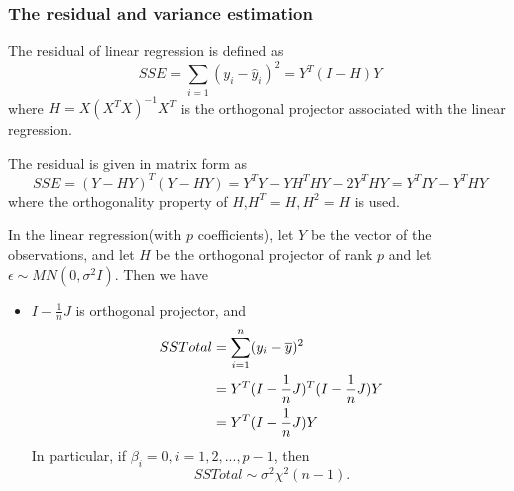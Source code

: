 \begin{refsection}
\begin{remark}
\end{remark}




\subsubsection{The residual and variance estimation}
\begin{definition}
	The residual of linear regression is defined as
	$$SSE = \sum_{i=1} (y_i - \hat{y}_i)^2 = Y^T(I-H)Y$$
	where $H=X(X^TX)^{-1}X^T$ is the orthogonal projector associated with the linear regression.
\end{definition}

\begin{remark}[derivation]
	The residual is given in matrix form as $$SSE = (Y - HY)^T(Y-HY) = Y^TY - YH^THY - 2Y^THY = Y^TIY - Y^THY$$
	where the orthogonality property of $H$,$H^T = H,H^2 = H$ is used. 
\end{remark}


\begin{theorem}\label{ch:theory-of-statistics:th:variancedecompositionlinearregression}\cite[76]{montgomery2012introduction}
	In the linear regression(with $p$ coefficients), let $Y$ be the vector of the observations, and let $H$ be the orthogonal projector of rank $p$ and let $\epsilon \sim MN(0,\sigma^2 I)$. Then we have
	\begin{itemize}
		\item $I-\frac{1}{n}J$ is orthogonal projector, and 
		\begin{align*}
		SSTotal &= \sum_{i=1}^{n} (y_i - \overline{y})^2 \\
		&= Y^T(I-\frac{1}{n}J)^T(I-\frac{1}{n}J)Y\\
		&=Y^T(I-\frac{1}{n}J)Y
		\end{align*}
	In particular, if $\beta_i = 0,i=1,2,...,p-1$, then
	$$SSTotal \sim \sigma^2 \chi^2(n-1).$$	
		

\end{itemize}
\end{theorem}
\end{refsection}
